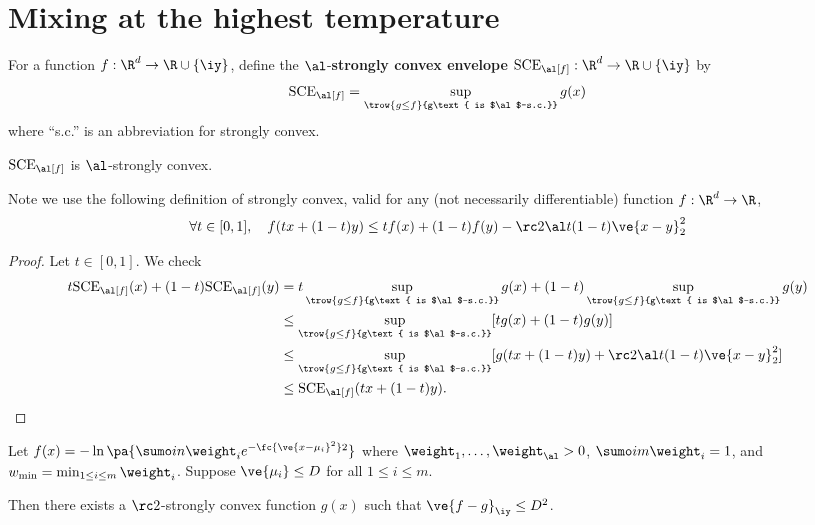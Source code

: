 \section{Mixing at the highest temperature}

\begin{df}
For a function $f:\R^d\to \R\cup \{\iy\}$, define the $\al$-\textbf{strongly convex envelope} $\text{SCE}_\al[f]:\R^d\to \R\cup \{\iy\}$ by
\begin{align}
\text{SCE}_\al[f] = \sup_{\trow{g\le f}{g\text{ is $\al$-s.c.}}}g(x)
\end{align}
where ``s.c.'' is an abbreviation for strongly convex. 
\end{df}
\begin{pr}\label{pr:sce}
$\text{SCE}_\al[f]$ is $\al$-strongly convex.
\end{pr}
Note we use the following definition of strongly convex, valid for any (not necessarily differentiable) function $f:\R^d\to \R$,
\begin{align}
\forall t\in [0,1], \quad 
f(tx+(1-t)y) \le tf(x) + (1-t)f(y) - \rc 2 \al t(1-t) \ve{x-y}_2^2
\end{align}
\begin{proof}
Let $t\in [0,1]$. We check
\begin{align}
t\text{SCE}_\al[f](x) + (1-t) \text{SCE}_\al[f](y)
& = t\sup_{\trow{g\le f}{g\text{ is $\al$-s.c.}}} g(x)
+ 
(1-t)\sup_{\trow{g\le f}{g\text{ is $\al$-s.c.}}} g(y)
\\
&\le \sup_{\trow{g\le f}{g\text{ is $\al$-s.c.}}} [tg(x)+(1-t)g(y)]\\
&\le \sup_{\trow{g\le f}{g\text{ is $\al$-s.c.}}}[g(tx+(1-t)y) + \rc 2 \al t(1-t)\ve{x-y}_2^2]\\
&\le \text{SCE}_\al[f](tx+(1-t)y).
\end{align}
\end{proof}
\begin{lem}\label{lem:hitemp}
Let $ f(x) = -\ln\pa{\sumo in \weight_i e^{-\fc{\ve{x-\mu_i}^2}2}}$ where $\weight_1,\ldots, \weight_\al>0$, $\sumo im \weight_i=1$, and $w_{\min} = \min_{1\le i\le m}\weight_i$.
Suppose $\ve{\mu_i}\le D$ for all $1\le i\le m$.

Then there exists a $\rc2$-strongly convex function $g(x)$ such that $\ve{f-g}_{\iy}\le D^2$.
\end{lem}
